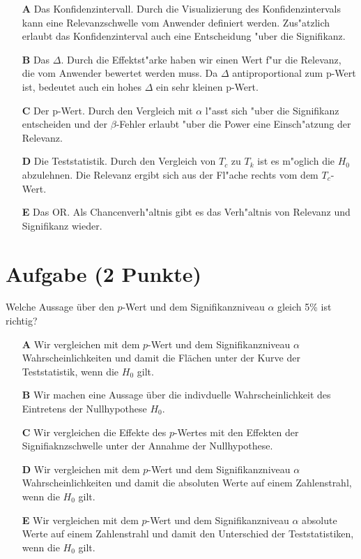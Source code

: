 \documentclass[a4paper, 10pt]{scrartcl}\usepackage[]{graphicx}\usepackage[]{xcolor}
\begin{document}
\begin{enumerate}
\item [\textbf{A} \msquare] Das Konfidenzintervall. Durch die Visualizierung des Konfidenzintervals kann eine Relevanzschwelle vom Anwender definiert werden. Zus{"a}tzlich erlaubt das Konfidenzinterval auch eine Entscheidung {"u}ber die Signifikanz.
\item [\textbf{B} \msquare] Das $\Delta$. Durch die Effektst{"a}rke haben wir einen Wert f{"u}r die Relevanz, die vom Anwender bewertet werden muss. Da $\Delta$ antiproportional zum p-Wert ist, bedeutet auch ein hohes $\Delta$ ein sehr kleinen p-Wert.
\item [\textbf{C} \msquare] Der p-Wert. Durch den Vergleich mit $\alpha$ l{"a}sst sich {"u}ber die Signifikanz entscheiden und der $\beta$-Fehler erlaubt {"u}ber die Power eine Einsch{"a}tzung der Relevanz.
\item [\textbf{D} \msquare] Die Teststatistik. Durch den Vergleich von $T_c$ zu $T_k$ ist es m{"o}glich die $H_0$ abzulehnen. Die Relevanz ergibt sich aus der Fl{"a}che rechts vom dem $T_c$-Wert.
\item [\textbf{E} \msquare] Das OR. Als Chancenverh{"a}ltnis gibt es das Verh{"a}ltnis von Relevanz und Signifikanz wieder.
\end{enumerate}

\section{Aufgabe \hfill (2 Punkte)}

Welche Aussage über den $p$-Wert und dem Signifikanzniveau $\alpha$ gleich 5\% ist richtig?



\begin{enumerate}
\item [\textbf{A} \msquare] Wir vergleichen mit dem $p$-Wert und dem Signifikanzniveau $\alpha$ Wahrscheinlichkeiten und damit die Flächen unter der Kurve der Teststatistik, wenn die $H_0$ gilt.
\item [\textbf{B} \msquare] Wir machen eine Aussage über die indivduelle Wahrscheinlichkeit des Eintretens der Nullhypothese $H_0$.
\item [\textbf{C} \msquare] Wir vergleichen die Effekte des $p$-Wertes mit den Effekten der Signifiaknzschwelle unter der Annahme der Nullhypothese.
\item [\textbf{D} \msquare] Wir vergleichen mit dem $p$-Wert und dem Signifikanzniveau $\alpha$ Wahrscheinlichkeiten und damit die absoluten Werte auf einem Zahlenstrahl, wenn die $H_0$ gilt.
\item [\textbf{E} \msquare] Wir vergleichen mit dem $p$-Wert und dem Signifikanzniveau $\alpha$ absolute Werte auf einem Zahlenstrahl und damit den Unterschied der Teststatistiken, wenn die $H_0$ gilt.
\end{enumerate}
\end{document}
